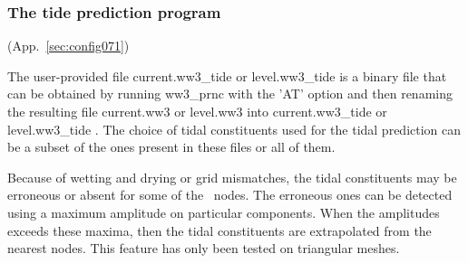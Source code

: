\vsssub
\subsubsection{The tide prediction program} \label{sub:ww3prtide}
\vsssub

 (App.~\ref{sec:config071})

\vspace{\baselineskip} 
\vspace{\baselineskip} 
\noindent 
The user-provided file current.ww3\_tide or level.ww3\_tide is a binary file
that can be obtained by running ww3\_prnc with the 'AT' option and then
renaming the resulting file current.ww3 or level.ww3 into current.ww3\_tide or
level.ww3\_tide . The choice of tidal constituents used for the tidal
prediction can be a subset of the ones present in these files or all of them.

Because of wetting and drying or grid mismatches, the tidal constituents may
be erroneous or absent for some of the \ws\ nodes. The erroneous ones can be
detected using a maximum amplitude on particular components. When the
amplitudes exceeds these maxima, then the tidal constituents are extrapolated
from the nearest nodes. This feature has only been tested on triangular
meshes.

\pb
